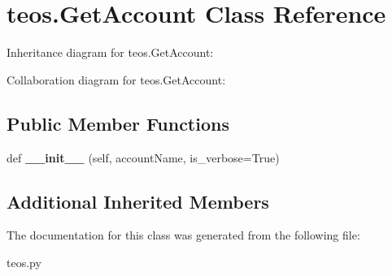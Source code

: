 \hypertarget{classteos_1_1GetAccount}{}\section{teos.\+Get\+Account Class Reference}
\label{classteos_1_1GetAccount}


Inheritance diagram for teos.\+Get\+Account\+:


Collaboration diagram for teos.\+Get\+Account\+:
\subsection*{Public Member Functions}
\begin{DoxyCompactItemize}
\item 
\mbox{\label{classteos_1_1GetAccount_ad5015a910201326e7634c52e7be1f6e1}} 
def {\bfseries \+\_\+\+\_\+init\+\_\+\+\_\+} (self, account\+Name, is\+\_\+verbose=True)
\end{DoxyCompactItemize}
\subsection*{Additional Inherited Members}


The documentation for this class was generated from the following file\+:\begin{DoxyCompactItemize}
\item 
teos.\+py\end{DoxyCompactItemize}
